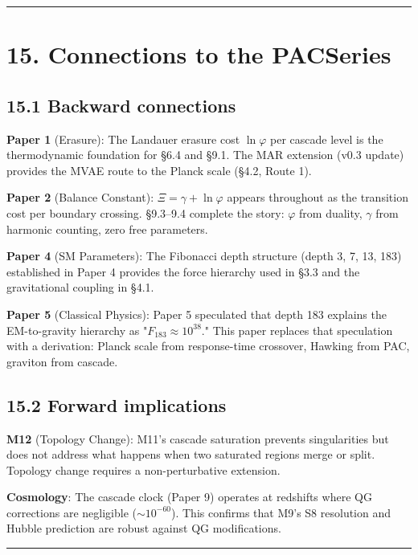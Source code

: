 \documentclass[11pt,a4paper]{article}
\begin{document}
\begin{center}\rule{0.5\linewidth}{0.4pt}\end{center}

\section*{15. Connections to the PACSeries}

\subsection*{15.1 Backward connections}

\textbf{Paper 1} (Erasure): The Landauer erasure cost $\ln\varphi$ per cascade level is the thermodynamic foundation for §6.4 and §9.1. The MAR extension (v0.3 update) provides the MVAE route to the Planck scale (§4.2, Route 1).

\textbf{Paper 2} (Balance Constant): $\Xi = \gamma + \ln\varphi$ appears throughout as the transition cost per boundary crossing. §9.3–9.4 complete the story: $\varphi$ from duality, $\gamma$ from harmonic counting, zero free parameters.

\textbf{Paper 4} (SM Parameters): The Fibonacci depth structure (depth 3, 7, 13, 183) established in Paper 4 provides the force hierarchy used in §3.3 and the gravitational coupling in §4.1.

\textbf{Paper 5} (Classical Physics): Paper 5 speculated that depth 183 explains the EM-to-gravity hierarchy as "$F_{183} \approx 10^{38}$." This paper replaces that speculation with a derivation: Planck scale from response-time crossover, Hawking from PAC, graviton from cascade.

\subsection*{15.2 Forward implications}

\textbf{M12} (Topology Change): M11's cascade saturation prevents singularities but does not address what happens when two saturated regions merge or split. Topology change requires a non-perturbative extension.

\textbf{Cosmology}: The cascade clock (Paper 9) operates at redshifts where QG corrections are negligible ($\sim 10^{-60}$). This confirms that M9's S8 resolution and Hubble prediction are robust against QG modifications.

\begin{center}\rule{0.5\linewidth}{0.4pt}\end{center}
\end{document}

